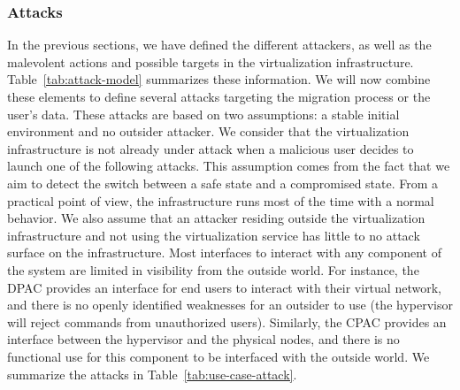\subsubsection{Attacks}
\label{sec:model-attacks}
In the previous sections, we have defined the different attackers, as well as the malevolent actions and possible targets in the virtualization infrastructure. 
Table~\ref{tab:attack-model} summarizes these information.
We will now combine these elements to define several attacks targeting the migration process or the user's data.
These attacks are based on two assumptions: a stable initial environment and no outsider attacker.
We consider that the virtualization infrastructure is not already under attack when a malicious user decides to launch one of the following attacks.
This assumption comes from the fact that we aim to detect the switch between a safe state and a compromised state. From a practical point of view, the infrastructure runs most of the time with a normal behavior.
We also assume that an attacker residing outside the virtualization infrastructure and not using the virtualization service has little to no attack surface on the infrastructure.
Most interfaces to interact with any component of the system are limited in visibility from the outside world.
For instance, the DPAC provides an interface for end users to interact with their virtual network, and there is no openly identified weaknesses for an outsider to use (\ie the hypervisor will reject commands from unauthorized users).
Similarly, the CPAC provides an interface between the hypervisor and the physical nodes, and there is no functional use for this component to be interfaced with the outside world.
We summarize the attacks in Table~\ref{tab:use-case-attack}.

